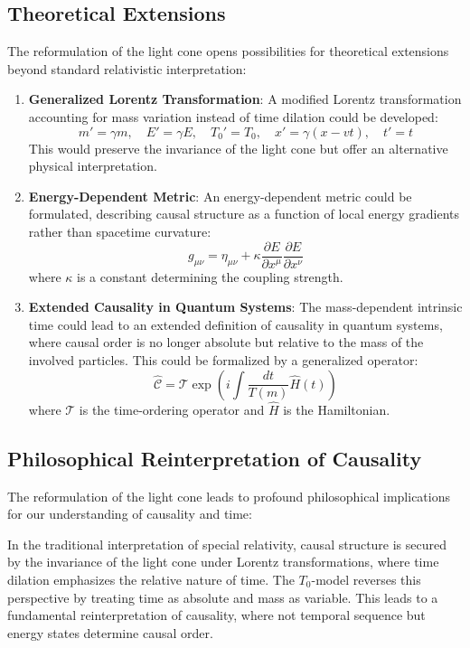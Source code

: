 \documentclass[a4paper,12pt]{article}
\begin{document}
	\subsection{Theoretical Extensions}
	The reformulation of the light cone opens possibilities for theoretical extensions beyond standard relativistic interpretation:
	
	\begin{enumerate}
		\item \textbf{Generalized Lorentz Transformation}: A modified Lorentz transformation accounting for mass variation instead of time dilation could be developed:
		\begin{equation}
			m' = \gamma m, \quad E' = \gamma E, \quad T_0' = T_0, \quad x' = \gamma(x - vt), \quad t' = t
		\end{equation}
		This would preserve the invariance of the light cone but offer an alternative physical interpretation.
		\item \textbf{Energy-Dependent Metric}: An energy-dependent metric could be formulated, describing causal structure as a function of local energy gradients rather than spacetime curvature:
		\begin{equation}
			g_{\mu\nu} = \eta_{\mu\nu} + \kappa \frac{\partial E}{\partial x^\mu}\frac{\partial E}{\partial x^\nu}
		\end{equation}
		where \( \kappa \) is a constant determining the coupling strength.
		\item \textbf{Extended Causality in Quantum Systems}: The mass-dependent intrinsic time could lead to an extended definition of causality in quantum systems, where causal order is no longer absolute but relative to the mass of the involved particles. This could be formalized by a generalized operator:
		\begin{equation}
			\hat{\mathcal{C}} = \mathcal{T} \exp\left(i\int \frac{dt}{T(m)} \hat{H}(t)\right)
		\end{equation}
		where \( \mathcal{T} \) is the time-ordering operator and \( \hat{H} \) is the Hamiltonian.
	\end{enumerate}
	
	\subsection{Philosophical Reinterpretation of Causality}
	The reformulation of the light cone leads to profound philosophical implications for our understanding of causality and time:
	
	In the traditional interpretation of special relativity, causal structure is secured by the invariance of the light cone under Lorentz transformations, where time dilation emphasizes the relative nature of time. The \( T_0 \)-model reverses this perspective by treating time as absolute and mass as variable. This leads to a fundamental reinterpretation of causality, where not temporal sequence but energy states determine causal order.
	
\end{document}
